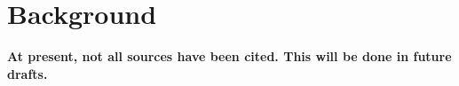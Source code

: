 \section{Background}

\textbf{At present, not all sources have been cited. This will be done in future drafts.}















